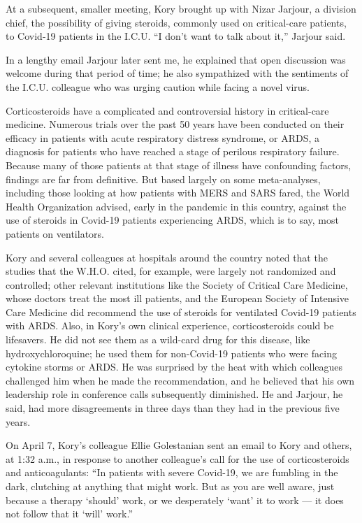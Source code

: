 At a subsequent, smaller meeting, Kory brought up with Nizar Jarjour, a
division chief, the possibility of giving steroids, commonly used on
critical-care patients, to Covid-19 patients in the I.C.U. ``I don't
want to talk about it,'' Jarjour said.

In a lengthy email Jarjour later sent me, he explained that open
discussion was welcome during that period of time; he also sympathized
with the sentiments of the I.C.U. colleague who was urging caution while
facing a novel virus.

Corticosteroids have a complicated and controversial history in
critical-care medicine. Numerous trials over the past 50 years have been
conducted on their efficacy in patients with acute respiratory distress
syndrome, or ARDS, a diagnosis for patients who have reached a stage of
perilous respiratory failure. Because many of those patients at that
stage of illness have confounding factors, findings are far from
definitive. But based largely on some meta-analyses, including those
looking at how patients with MERS and SARS fared, the World Health
Organization advised, early in the pandemic in this country, against the
use of steroids in Covid-19 patients experiencing ARDS, which is to say,
most patients on ventilators.

Kory and several colleagues at hospitals around the country noted that
the studies that the W.H.O. cited, for example, were largely not
randomized and controlled; other relevant institutions like the Society
of Critical Care Medicine, whose doctors treat the most ill patients,
and the European Society of Intensive Care Medicine did recommend the
use of steroids for ventilated Covid-19 patients with ARDS. Also, in
Kory's own clinical experience, corticosteroids could be lifesavers. He
did not see them as a wild-card drug for this disease, like
hydroxychloroquine; he used them for non-Covid-19 patients who were
facing cytokine storms or ARDS. He was surprised by the heat with which
colleagues challenged him when he made the recommendation, and he
believed that his own leadership role in conference calls subsequently
diminished. He and Jarjour, he said, had more disagreements in three
days than they had in the previous five years.

On April 7, Kory's colleague Ellie Golestanian sent an email to Kory and
others, at 1:32 a.m., in response to another colleague's call for the
use of corticosteroids and anticoagulants: ``In patients with severe
Covid-19, we are fumbling in the dark, clutching at anything that might
work. But as you are well aware, just because a therapy `should' work,
or we desperately `want' it to work --- it does not follow that it
`will' work.''

